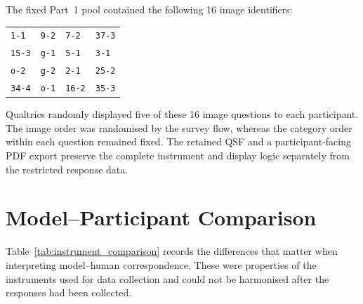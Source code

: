 \FloatBarrier

The fixed Part~1 pool contained the following 16 image identifiers:

\begin{center}
\small
\begin{tabular}{llll}
\texttt{1-1} & \texttt{9-2} & \texttt{7-2} & \texttt{37-3} \\
\texttt{15-3} & \texttt{g-1} & \texttt{5-1} & \texttt{3-1} \\
\texttt{o-2} & \texttt{g-2} & \texttt{2-1} & \texttt{25-2} \\
\texttt{34-4} & \texttt{o-1} & \texttt{16-2} & \texttt{35-3}
\end{tabular}
\end{center}

Qualtrics randomly displayed five of these 16 image questions to each
participant. The image order was randomised by the survey flow, whereas the
category order within each question remained fixed. The retained QSF and a
participant-facing PDF export preserve the complete instrument and display
logic separately from the restricted response data.

\section{Model--Participant Comparison}

Table~\ref{tab:instrument_comparison} records the differences that matter when
interpreting model--human correspondence. These were properties of the
instruments used for data collection and could not be harmonised after the
responses had been collected.

